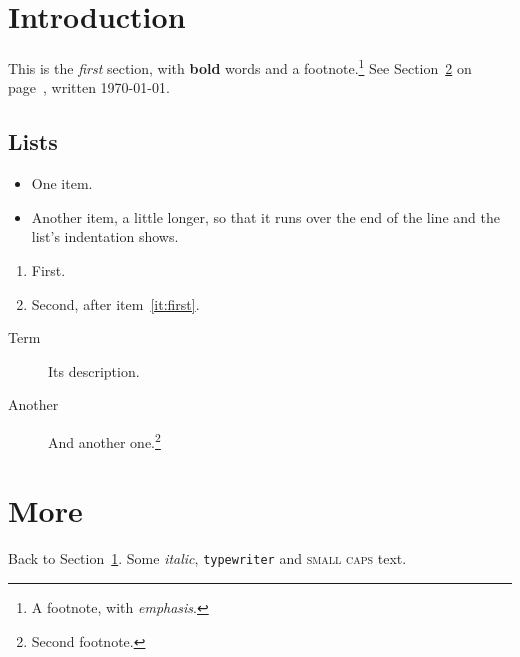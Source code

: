 \documentclass{article}
\begin{document}
\section{Introduction}\label{sec:intro}
This is the \emph{first} section, with \textbf{bold} words and a
footnote.\footnote{A footnote, with \emph{emphasis}.} See
Section~\ref{sec:more} on page~\pageref{sec:more}, written \today.

\subsection{Lists}
\begin{itemize}
\item One item.
\item Another item, a little longer, so that it runs over the end of the
  line and the list's indentation shows.
\end{itemize}
\begin{enumerate}
\item First.\label{it:first}
\item Second, after item~\ref{it:first}.
\end{enumerate}
\begin{description}
\item[Term] Its description.
\item[Another] And another one.\footnote{Second footnote.}
\end{description}

\section{More}\label{sec:more}
Back to Section~\ref{sec:intro}. Some \textit{italic}, \texttt{typewriter}
and \textsc{small caps} text.
\end{document}
